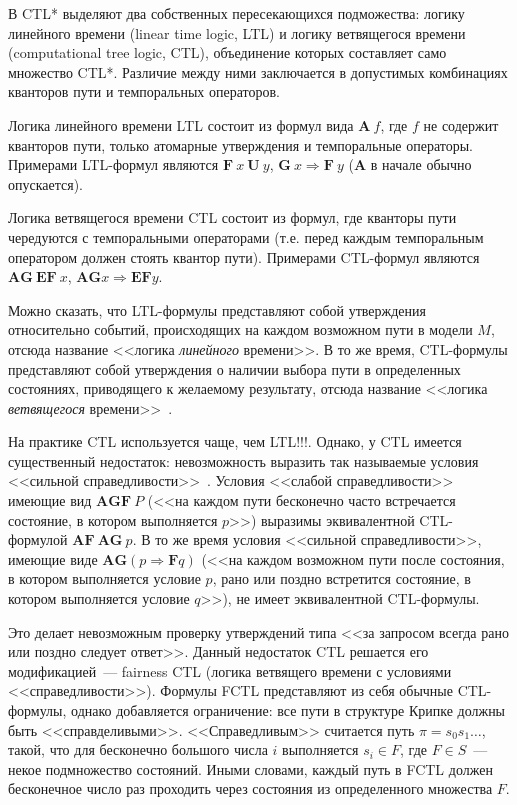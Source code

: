 \documentclass[a4paper,notitlepage,14pt]{article}
\begin{document}
В CTL* выделяют два собственных пересекающихся подможества: логику линейного времени
(linear time logic, LTL) и логику ветвящегося времени (computational tree logic, CTL),
объединение которых составляет само множество CTL*. Различие между ними заключается в
допустимых комбинациях кванторов пути и темпоральных операторов.

Логика линейного времени LTL состоит из формул вида $\mathbf{A}~f$, где $f$ не содержит
кванторов пути, только атомарные утверждения и темпоральные операторы. Примерами
LTL-формул являются $\mathbf{F}~x~\mathbf{U}~y$, $\mathbf{G}~x \Rightarrow \mathbf{F}~y$
($\mathbf{A}$ в начале обычно опускается).

Логика ветвящегося времени CTL состоит из формул, где кванторы пути чередуются с
темпоральными операторами (т.е. перед каждым темпоральным оператором должен стоять квантор
пути). Примерами CTL-формул являются $\mathbf{AG}~\mathbf{EF}~x$, $\mathbf{AG} x
\Rightarrow \mathbf{EF} y$.

Можно сказать, что LTL-формулы представляют собой утверждения относительно событий,
происходящих на каждом возможном пути в модели $M$, отсюда название <<логика
\emph{линейного} времени>>. В то же время, CTL-формулы представляют собой утверждения о
наличии выбора пути в определенных состояниях, приводящего к желаемому результату, отсюда
название <<логика \emph{ветвящегося} времени>>~\cite{Clarke}.

На практике CTL используется чаще, чем LTL!!!. Однако, у CTL имеется существенный
недостаток: невозможность выразить так называемые условия <<сильной
справедливости>>~\cite{Katoen,DBLP:conf/spin/FaragoS09}. Условия <<слабой справедливости>>
имеющие вид $\mathbf{AGF}~P$ (<<на каждом пути бесконечно часто встречается состояние, в
котором выполняется $p$>>) выразимы эквивалентной CTL-формулой $\mathbf{AF~AG}~p$. В то же
время условия <<сильной справедливости>>, имеющие виде $\mathbf{AG} (p \Rightarrow
\mathbf{F} q)$ (<<на каждом возможном пути после состояния, в котором выполняется условие
$p$, рано или поздно встретится состояние, в котором выполняется условие $q$>>), не имеет
эквивалентной CTL-формулы.

Это делает невозможным проверку утверждений типа <<за запросом всегда рано или поздно
следует ответ>>. Данный недостаток CTL решается его модификацией~--- fairness CTL (логика
ветвящего времени с условиями <<справедливости>>). Формулы FCTL представляют из себя
обычные CTL-формулы, однако добавляется ограничение: все пути в структуре Крипке должны
быть <<справделивыми>>. <<Справедливым>> считается путь $\pi = s_0s_1\ldots$, такой, что
для бесконечно большого числа $i$ выполняется $s_i \in F$, где $F \in S$~--- некое
подмножество состояний. Иными словами, каждый путь в FCTL должен бесконечное число раз
проходить через состояния из определенного множества $F$.
\end{document}
